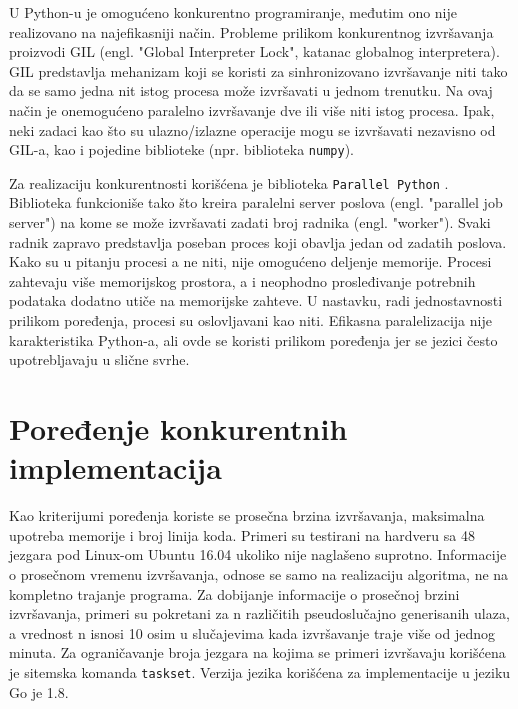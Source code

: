 \documentclass[12pt,oneside]{memoir}
\begin{document}
\label{gil}
U Python-u je omogućeno konkurentno programiranje, međutim ono nije realizovano na najefikasniji način. Probleme prilikom konkurentnog izvršavanja proizvodi GIL (engl. "Global Interpreter Lock", katanac globalnog interpretera). GIL predstavlja mehanizam koji se koristi za sinhronizovano izvršavanje niti tako da se samo jedna nit istog procesa može izvršavati u jednom trenutku. Na ovaj način je onemogućeno paralelno izvršavanje dve ili više niti istog procesa. Ipak, neki zadaci kao što su ulazno/izlazne operacije mogu se izvršavati nezavisno od GIL-a, kao i pojedine biblioteke (npr. biblioteka \texttt{numpy}).

Za realizaciju konkurentnosti korišćena je biblioteka \texttt{Parallel Python} \cite{pp}. Biblioteka funkcioniše tako što kreira paralelni server poslova (engl. "parallel job server") na kome se može izvršavati zadati broj radnika (engl. "worker"). Svaki radnik zapravo predstavlja poseban proces koji obavlja jedan od zadatih poslova. Kako su u pitanju procesi a ne niti, nije omogućeno deljenje memorije. Procesi zahtevaju više memorijskog prostora, a i neophodno prosleđivanje potrebnih podataka dodatno utiče na memorijske zahteve. U nastavku, radi jednostavnosti prilikom poređenja, procesi su oslovljavani kao niti. Efikasna paralelizacija nije karakteristika Python-a, ali ovde se koristi prilikom poređenja jer se jezici često upotrebljavaju u slične svrhe.

\section{Poređenje konkurentnih implementacija}
Kao kriterijumi poređenja koriste se prosečna brzina izvršavanja, maksimalna upotreba memorije i broj linija koda. Primeri su testirani na hardveru sa 48 jezgara pod Linux-om Ubuntu 16.04 ukoliko nije naglašeno suprotno. Informacije o prosečnom vremenu izvršavanja, odnose se samo na realizaciju algoritma, ne na kompletno trajanje programa. Za dobijanje informacije o prosečnoj brzini izvršavanja, primeri su pokretani za n različitih pseudoslučajno generisanih ulaza, a vrednost n isnosi 10 osim u slučajevima kada izvršavanje traje više od jednog minuta.  Za ograničavanje broja jezgara na kojima se primeri izvršavaju korišćena je sitemska komanda \texttt{taskset}. Verzija jezika korišćena za implementacije u jeziku Go je 1.8.
\end{document}
